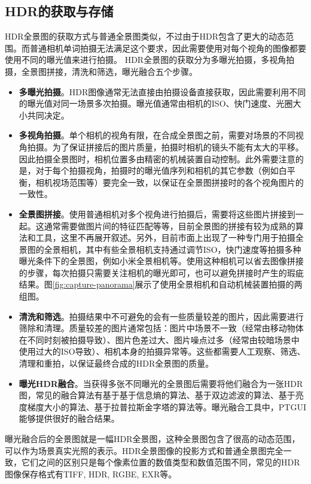 \subsection{HDR的获取与存储}

HDR全景图的获取方式与普通全景图类似，不过由于HDR包含了更大的动态范围。而普通相机单词拍摄无法满足这个要求，因此需要使用对每个视角的图像都要使用不同的曝光值来进行拍摄。
HDR全景图的获取分为多曝光拍摄，多视角拍摄，全景图拼接，清洗和筛选，曝光融合五个步骤。
\begin{itemize}
    \item \textbf{多曝光拍摄}。HDR图像通常无法直接由拍摄设备直接获取，因此需要利用不同的曝光值对同一场景多次拍摄。曝光值通常由相机的ISO、快门速度、光圈大小共同决定。
    \item \textbf{多视角拍摄}。单个相机的视角有限，在合成全景图之前，需要对场景的不同视角拍摄。为了保证拼接后的图片质量，拍摄时相机的镜头不能有太大的平移。因此拍摄全景图时，相机位置多由精密的机械装置自动控制。此外需要注意的是，对于每个拍摄视角，拍摄时的曝光值序列和相机的其它参数（例如白平衡，相机视场范围等）要完全一致，以保证在全景图拼接时的各个视角图片的一致性。
    \item \textbf{全景图拼接}。使用普通相机对多个视角进行拍摄后，需要将这些图片拼接到一起。这通常需要做图片间的特征匹配等等，目前全景图的拼接有较为成熟的算法和工具，这里不再展开叙述。另外，目前市面上出现了一种专门用于拍摄全景图的全景相机，其中有些全景相机支持通过调节ISO，快门速度等拍摄多种曝光条件下的全景图，例如小米全景相机\cite{xiaomi}等。使用这种相机可以省去图像拼接的步骤，每次拍摄只需要关注相机的曝光即可，也可以避免拼接时产生的瑕疵结果。图\ref{fig:capture-panorama}展示了使用全景相机和自动机械装置拍摄的两组图。
    \item \textbf{清洗和筛选}。拍摄结果中不可避免的会有一些质量较差的图片，因此需要进行筛除和清理。质量较差的图片通常包括：图片中场景不一致（经常由移动物体在不同时刻被拍摄导致）、图片色差过大、图片噪点过多（经常由较暗场景中使用过大的ISO导致）、相机本身的拍摄异常等。这些都需要人工观察、筛选、清理和重拍，以保证最终合成的HDR全景图的质量。
    \item \textbf{曝光HDR融合}。当获得多张不同曝光的全景图后需要将他们融合为一张HDR图，常见的融合算法有基于基于信息熵的算法、基于双边滤波的算法、基于亮度梯度大小的算法、基于拉普拉斯金字塔的算法等。曝光融合工具中，PTGUI\cite{ptgui}能够提供很好的融合结果。
\end{itemize}
曝光融合后的全景图就是一幅HDR全景图，这种全景图包含了很高的动态范围，可以作为场景真实光照的表示。HDR全景图像的投影方式和普通全景图完全一致，它们之间的区别只是每个像素位置的数值类型和数值范围不同，常见的HDR图像保存格式有TIFF, HDR, RGBE, EXR等。

